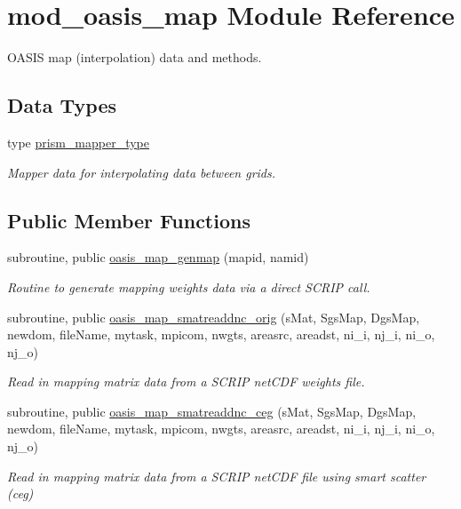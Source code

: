 \hypertarget{classmod__oasis__map}{\section{mod\+\_\+oasis\+\_\+map Module Reference}
\label{classmod__oasis__map}
}


O\+A\+S\+I\+S map (interpolation) data and methods.  


\subsection*{Data Types}
\begin{DoxyCompactItemize}
\item 
type \hyperlink{structmod__oasis__map_1_1prism__mapper__type}{prism\+\_\+mapper\+\_\+type}
\begin{DoxyCompactList}\small\item\em Mapper data for interpolating data between grids. \end{DoxyCompactList}\end{DoxyCompactItemize}
\subsection*{Public Member Functions}
\begin{DoxyCompactItemize}
\item 
subroutine, public \hyperlink{classmod__oasis__map_a6f27846fb1dcb2db3095b9ace4fa3c5b}{oasis\+\_\+map\+\_\+genmap} (mapid, namid)
\begin{DoxyCompactList}\small\item\em Routine to generate mapping weights data via a direct S\+C\+R\+I\+P call. \end{DoxyCompactList}\item 
subroutine, public \hyperlink{classmod__oasis__map_acbe7b9e25c19dbbd2fbebd3895a87d64}{oasis\+\_\+map\+\_\+smatreaddnc\+\_\+orig} (s\+Mat, Sgs\+Map, Dgs\+Map, newdom, file\+Name, mytask, mpicom, nwgts, areasrc, areadst, ni\+\_\+i, nj\+\_\+i, ni\+\_\+o, nj\+\_\+o)
\begin{DoxyCompactList}\small\item\em Read in mapping matrix data from a S\+C\+R\+I\+P net\+C\+D\+F weights file. \end{DoxyCompactList}\item 
subroutine, public \hyperlink{classmod__oasis__map_a3345e2fc3d74cc1221d6c6d993233990}{oasis\+\_\+map\+\_\+smatreaddnc\+\_\+ceg} (s\+Mat, Sgs\+Map, Dgs\+Map, newdom, file\+Name, mytask, mpicom, nwgts, areasrc, areadst, ni\+\_\+i, nj\+\_\+i, ni\+\_\+o, nj\+\_\+o)
\begin{DoxyCompactList}\small\item\em Read in mapping matrix data from a S\+C\+R\+I\+P net\+C\+D\+F file using smart scatter (ceg) \end{DoxyCompactList}\end{DoxyCompactItemize}
